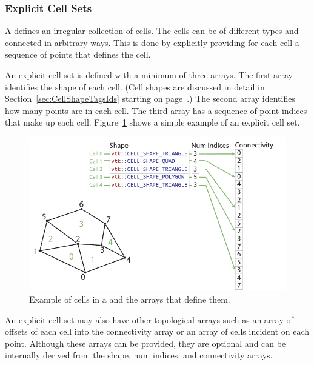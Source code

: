 
\subsubsection{Explicit Cell Sets}


A  defines an irregular collection of cells. The
cells can be of different types and connected in arbitrary ways. This is
done by explicitly providing for each cell a sequence of points that
defines the cell.

An explicit cell set is defined with a minimum of three arrays. The first
array identifies the shape of each cell. (Cell shapes are discussed in
detail in Section~\ref{sec:CellShapeTagsIds} starting on
page~\pageref{sec:CellShapeTagsIds}.) The second array identifies how many
points are in each cell. The third array has a sequence of point indices
that make up each cell. Figure~\ref{fig:CellSetExplicit} shows a simple
example of an explicit cell set.

\begin{figure}
  \centering
  \includegraphics{images/ExplicitCellConnections}
  \caption{Example of cells in a  and the
    arrays that define them.}
  \label{fig:CellSetExplicit}
\end{figure}

An explicit cell set may also have other topological arrays such as an
array of offsets of each cell into the connectivity array or an array of
cells incident on each point. Although these arrays can be provided, they
are optional and can be internally derived from the shape, num indices, and
connectivity arrays.

